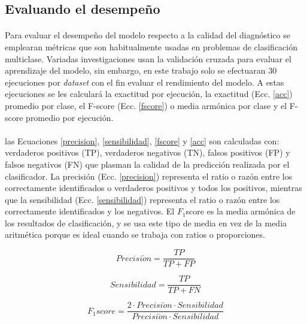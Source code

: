 \documentclass[12pt]{article}%
\begin{document}
\subsection{Evaluando el desempeño}

\paragraph{}
Para evaluar el desempeño del modelo respecto a la calidad del diagnóstico se emplearan métricas que son habitualmente usadas en problemas de clasificación multiclase. Variadas investigaciones usan la validación cruzada para evaluar el aprendizaje del modelo, sin embargo, en este trabajo solo se efectuaran 30 ejecuciones por \textit{dataset} con el fin evaluar el rendimiento del modelo. A estas ejecuciones se les calculará la exactitud por ejecución, la exactitud (Ecc. \ref{acc}) promedio por clase, el F-score (Ecc. \ref{fscore}) o media armónica por clase y el F-score promedio por ejecución.

\paragraph{}
las Ecuaciones \ref{precision}, \ref{sensibilidad}, \ref{fscore} y \ref{acc} son calculadas con: verdaderos positivos (TP), verdaderos negativos (TN), falsos positivos (FP) y falsos negativos (FN) que plasman la calidad de la predicción realizada por el clasificador. La precisión (Ecc. \ref{precision}) representa el ratio o razón entre los correctamente identificados o verdaderos positivos y todos los positivos, mientras que la sensibilidad (Ecc. \ref{sensibilidad}) representa el ratio o razón entre los correctamente identificados y los negativos. El $F_{1}$score es la media armónica de los resultados de clasificación, y se usa este tipo de media en vez de la media aritmética porque es ideal cuando se trabaja con ratios o proporciones.

\begin{equation}
\label{precision}
Precisi\acute{o}n = \frac{TP}{TP+FP}
\end{equation}

\begin{equation}
\label{sensibilidad}
Sensibilidad = \frac{TP}{TP+FN}
\end{equation}

\begin{equation}
\label{fscore}
F_{1}score = \frac{2\cdot{Precisi\acute{o}n}\cdot{Sensibilidad}}{Precisi\acute{o}n\cdot{Sensibilidad}}
\end{equation}
\end{document}
